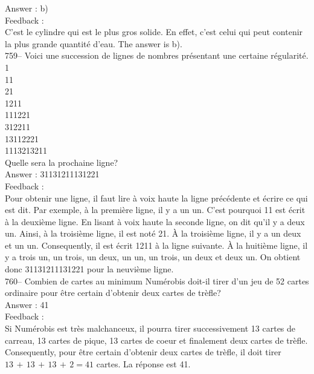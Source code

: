 \documentclass[letterpaper, 12pt]{article}
\begin{document}
Answer : b)\\

Feedback : \\
C'est le cylindre qui est le plus gros solide. En effet, c'est celui qui
peut contenir la plus grande quantit\'e d'eau.  The answer is b).\\

759-- Voici une succession de lignes de nombres pr\'esentant une certaine
r\'egularit\'e.  \\
1\\
11\\
21\\
1211\\
111221\\
312211\\
13112221\\
1113213211\\

Quelle sera la prochaine ligne?\\

Answer : 31131211131221\\

Feedback : \\
Pour obtenir une ligne, il faut lire \`a voix haute la ligne pr\'ec\'edente
et \'ecrire ce qui est dit.  Par exemple, \`a la premi\`ere ligne, il y a un
un.  C'est pourquoi 11 est \'ecrit \`a la deuxi\`eme ligne. En lisant \`a
voix haute la seconde ligne, on dit qu'il y a deux un.  Ainsi, \`a la
troisi\`eme ligne, il est not\'e 21.  \`A la troisi\`eme ligne, il y a un
deux et un un.  Consequently, il est \'ecrit 1211 \`a la ligne suivante.
  \`A la huiti\`eme ligne, il y a trois un, un trois, un deux, un un, un
trois, un deux et deux un. On obtient donc 31131211131221 pour la neuvi\`eme
ligne.\\


760--  Combien de cartes au minimum Num\'erobis doit-il tirer d'un jeu de 52
cartes ordinaire pour \^etre certain d'obtenir deux cartes de tr\`efle?\\

Answer : 41\\

Feedback : \\
Si Num\'erobis est tr\`es malchanceux, il pourra tirer successivement 13
cartes de carreau, 13 cartes de pique, 13 cartes de coeur et finalement deux
cartes de tr\`efle.  Consequently, pour \^etre certain d'obtenir deux
cartes de tr\`efle, il doit tirer $13\,+\,13\,+\,13\,+\,2=41$ cartes.  La
r\'eponse est 41.\\
\end{document}
